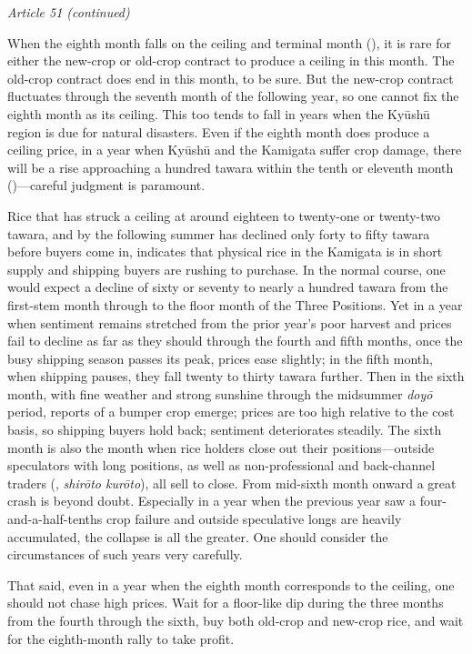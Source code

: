 \begin{sokyubox}
{\small\itshape\color{sokyubar} Article 51 (continued)}

\medskip
When the eighth month falls on the ceiling and terminal month
(), it is rare for either the new-crop or
old-crop contract to produce a ceiling in this month. The old-crop
contract does end in this month, to be sure. But the new-crop contract
fluctuates through the seventh month of the following year, so one
cannot fix the eighth month as its ceiling. This too tends to fall in
years when the Ky\=ush\=u region is due for natural disasters. Even if
the eighth month does produce a ceiling price, in a year when Ky\=ush\=u
and the Kamigata suffer crop damage, there will be a rise approaching a
hundred tawara within the tenth or eleventh month ()---careful
judgment is paramount.

Rice that has struck a ceiling at around eighteen to twenty-one or
twenty-two tawara, and by the following summer has declined only forty to
fifty tawara before buyers come in, indicates that physical rice in the
Kamigata is in short supply and shipping buyers are rushing to purchase.
In the normal course, one would expect a decline of sixty or seventy to
nearly a hundred tawara from the first-stem month through to the floor
month of the Three Positions. Yet in a year when sentiment remains
stretched from the prior year's poor harvest and prices fail to decline
as far as they should through the fourth and fifth months, once the busy
shipping season passes its peak, prices ease slightly; in the fifth
month, when shipping pauses, they fall twenty to thirty tawara further.
Then in the sixth month, with fine weather and strong sunshine through
the midsummer \textit{doy\=o} period, reports of a bumper crop emerge;
prices are too high relative to the cost basis, so shipping buyers hold
back; sentiment deteriorates steadily. The sixth month is also the month
when rice holders close out their positions---outside speculators with
long positions, as well as non-professional and back-channel traders
(, \textit{shir\=oto kur\=oto}), all sell to close. From
mid-sixth month onward a great crash is beyond doubt. Especially in a
year when the previous year saw a four-and-a-half-tenths crop failure
and outside speculative longs are heavily accumulated, the collapse is
all the greater. One should consider the circumstances of such years
very carefully.

That said, even in a year when the eighth month corresponds to the
ceiling, one should not chase high prices. Wait for a floor-like dip
during the three months from the fourth through the sixth, buy both
old-crop and new-crop rice, and wait for the eighth-month rally to take
profit.


\end{sokyubox}
